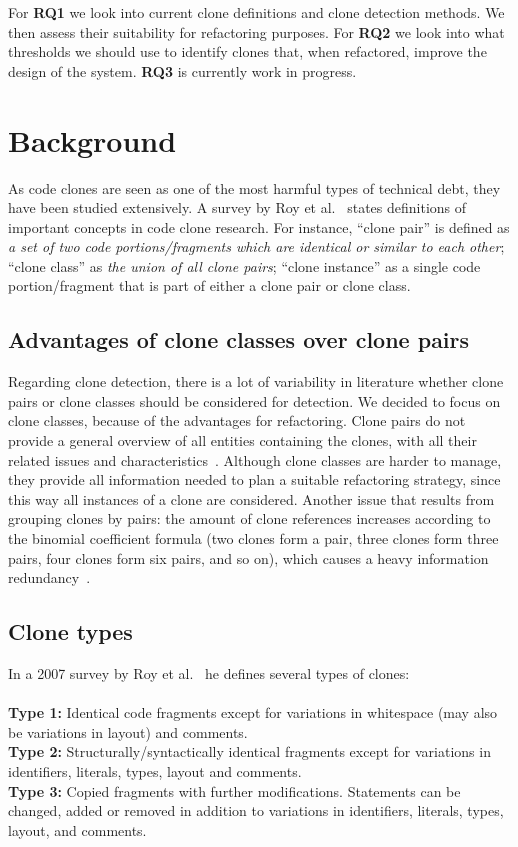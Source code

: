 \documentclass[a4paper]{article}
\begin{document}
For \textbf{RQ1} we look into current clone definitions and clone detection methods. We then assess their suitability for refactoring purposes. For \textbf{RQ2} we look into what thresholds we should use to identify clones that, when refactored, improve the design of the system. \textbf{RQ3} is currently work in progress.

\section{Background}\label{chap:background}
As code clones are seen as one of the most harmful types of technical debt, they have been studied extensively. A survey by Roy et al.~\cite{roy2007survey} states definitions of important concepts in code clone research. For instance, ``clone pair'' is defined as \textit{a set of two code portions/fragments which are identical or similar to each other}; ``clone class'' as \textit{the union of all clone pairs}; ``clone instance'' as a single code portion/fragment that is part of either a clone pair or clone class.

\subsection{Advantages of clone classes over clone pairs}\label{chap:cloneclasses}
Regarding clone detection, there is a lot of variability in literature whether clone pairs or clone classes should be considered for detection. We decided to focus on clone classes, because of the advantages for refactoring. Clone pairs do not provide a general overview of all entities containing the clones, with all their related issues and characteristics~\cite{fontana2012duplicated}. Although clone classes are harder to manage, they provide all information needed to plan a suitable refactoring strategy, since this way all instances of a clone are considered. Another issue that results from grouping clones by pairs: the amount of clone references increases according to the binomial coefficient formula (two clones form a pair, three clones form three pairs, four clones form six pairs, and so on), which causes a heavy information redundancy~\cite{fontana2012duplicated}.

\subsection{Clone types}\label{chap:backgroundclonetypes}
In a 2007 survey by Roy et al.~\cite{roy2007survey} he defines several types of clones:
\\\\
\textbf{Type 1:} Identical code fragments except for variations in whitespace (may also be variations in layout) and comments.\\
\textbf{Type 2:} Structurally/syntactically identical fragments except for variations in identifiers, literals, types, layout and comments.\\
\textbf{Type 3:} Copied fragments with further modifications. Statements can be changed, added or removed in addition to variations in identifiers, literals, types, layout, and comments.\\
\end{document}
